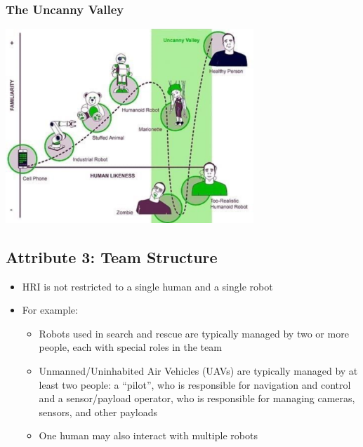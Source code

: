 \documentclass[10pt]{article}
\begin{document}
\subsubsection*{The Uncanny Valley}
\begin{center} 
    \includegraphics*[width=0.7\textwidth]{L1_12.png} 
\end{center}

\subsection*{Attribute 3: Team Structure}
\begin{itemize}
	\item HRI is not restricted to a single human and a single robot
	\item For example:
	\begin{itemize}
        \item Robots used in search and rescue are typically managed by two or more people, each with special roles in the team
        \item Unmanned/Uninhabited Air Vehicles (UAVs) are typically managed by at least two people: a “pilot”, who is responsible for navigation and control and a sensor/payload operator, who is responsible for managing cameras, sensors, and other payloads
        \item One human may also interact with multiple robots
    \end{itemize}
\end{itemize}
\end{document}
